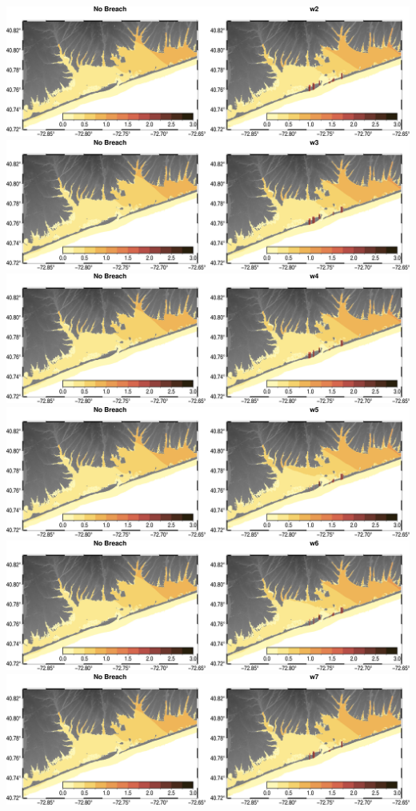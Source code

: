 \includegraphics[width=\textwidth]{images/fgmax/w2_fgmax_no_lines.png}
\includegraphics[width=\textwidth]{images/fgmax/w3_fgmax_no_lines.png}
\includegraphics[width=\textwidth]{images/fgmax/w4_fgmax_no_lines.png}
\includegraphics[width=\textwidth]{images/fgmax/w5_fgmax_no_lines.png}
\includegraphics[width=\textwidth]{images/fgmax/w6_fgmax_no_lines.png}
\includegraphics[width=\textwidth]{images/fgmax/w7_fgmax_no_lines.png}
